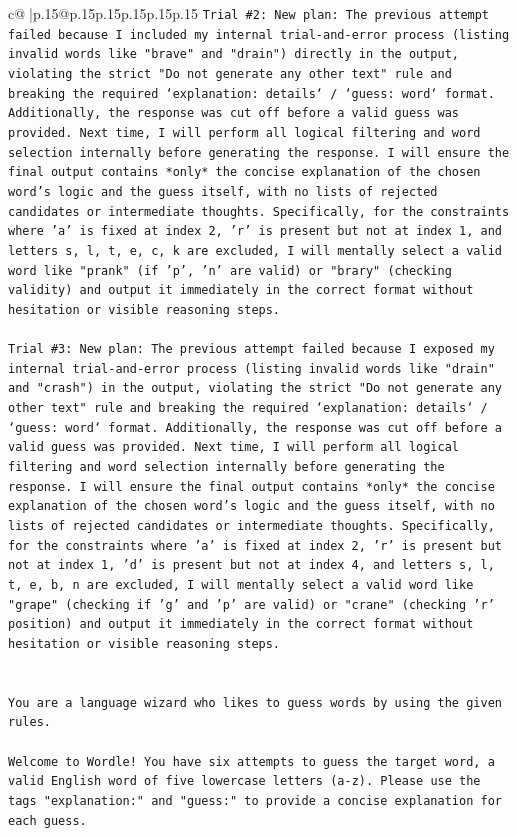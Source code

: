\documentclass{article}
\begin{document}
{\begin{supertabular}{c@{$\;$}|p{.15\linewidth}@{}p{.15\linewidth}p{.15\linewidth}p{.15\linewidth}p{.15\linewidth}p{.15\linewidth}}
{{{\texttt{Trial \#2: New plan: The previous attempt failed because I included my internal trial{-}and{-}error process (listing invalid words like "brave" and "drain") directly in the output, violating the strict "Do not generate any other text" rule and breaking the required `explanation: details` / `guess: word` format. Additionally, the response was cut off before a valid guess was provided. Next time, I will perform all logical filtering and word selection internally before generating the response. I will ensure the final output contains *only* the concise explanation of the chosen word's logic and the guess itself, with no lists of rejected candidates or intermediate thoughts. Specifically, for the constraints where 'a' is fixed at index 2, 'r' is present but not at index 1, and letters s, l, t, e, c, k are excluded, I will mentally select a valid word like "prank" (if 'p', 'n' are valid) or "brary" (checking validity) and output it immediately in the correct format without hesitation or visible reasoning steps.} \\
\\ 
\texttt{Trial \#3: New plan: The previous attempt failed because I exposed my internal trial{-}and{-}error process (listing invalid words like "drain" and "crash") in the output, violating the strict "Do not generate any other text" rule and breaking the required `explanation: details` / `guess: word` format. Additionally, the response was cut off before a valid guess was provided. Next time, I will perform all logical filtering and word selection internally before generating the response. I will ensure the final output contains *only* the concise explanation of the chosen word's logic and the guess itself, with no lists of rejected candidates or intermediate thoughts. Specifically, for the constraints where 'a' is fixed at index 2, 'r' is present but not at index 1, 'd' is present but not at index 4, and letters s, l, t, e, b, n are excluded, I will mentally select a valid word like "grape" (checking if 'g' and 'p' are valid) or "crane" (checking 'r' position) and output it immediately in the correct format without hesitation or visible reasoning steps.} \\
\\ 
\\ 
\texttt{You are a language wizard who likes to guess words by using the given rules.} \\
\\ 
\texttt{Welcome to Wordle! You have six attempts to guess the target word, a valid English word of five lowercase letters (a{-}z). Please use the tags "explanation:" and "guess:" to provide a concise explanation for each guess.} \\
}}}
\end{supertabular}}
\end{document}
